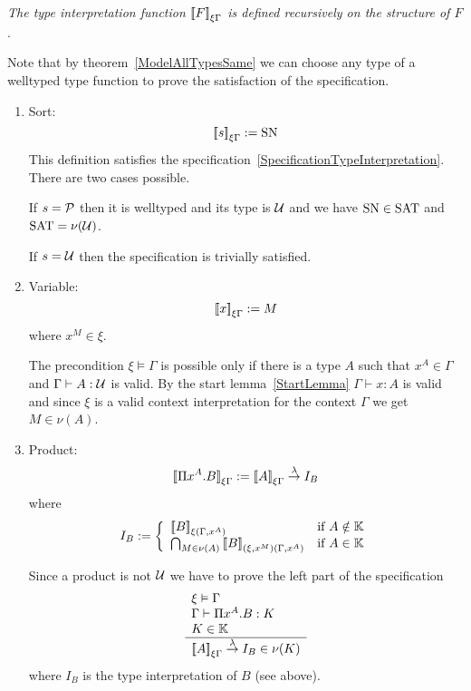 \begin{definition}
    \label{DefinitionTypeInterpretation}
    \emph{The type interpretation function ${{{[\![} F {]\!]}}_{\xi\Gamma}}$ is defined
    recursively on the structure of $F$}.

    Note that by theorem~\ref{ModelAllTypesSame} we can choose any type of a
    welltyped type function to prove the satisfaction of the specification.

    \begin{enumerate}
    \item Sort:
        $$
        {{{[\![} s {]\!]}}_{\xi\Gamma}} := \text{SN}
        $$
        This definition satisfies the
            specification~\ref{SpecificationTypeInterpretation}. There are two
            cases possible.

            If $s = {\cal P}$ then it is welltyped and its type is ${\cal U}$ and we
            have $\text{SN} \in \text{SAT}$ and $\text{SAT} = \nu({\cal U})$.

            If $s = {\cal U}$ then the specification is trivially satisfied.

    \item Variable:
        $$
        {{{[\![} x {]\!]}}_{\xi\Gamma}} := M
        $$
        where $x^{M} \in \xi$.

        The precondition $\xi \vDash \Gamma$ is possible only if there is a type
        $A$ such that $x^A \in \Gamma$ and $\Gamma \vdash A: {\cal U}$ is valid.
        By the start lemma~\ref{StartLemma} $\Gamma \vdash x : A$ is valid
        and since $\xi$ is a valid context interpretation for the context
        $\Gamma$ we get $M \in \nu(A)$.


    \item Product:
        $$
            {{{[\![} \Pi x^A.B {]\!]}}_{\xi\Gamma}}
            :=
            {{{[\![} A {]\!]}}_{\xi\Gamma}} \stackrel{\lambda}{\to} I_B
        $$
        where
            $$
            I_B :=
            \left\{
            \begin{array}{ll}
                {{{[\![}B {]\!]}}_{\xi(\Gamma,x^A)}}
                & \text{if } A \notin \mathbb{K}
                \\
                \bigcap_{M\in\nu(A)}
                {{{[\![} B {]\!]}}_{(\xi,x^M)(\Gamma,x^A)}}
                & \text{if }  A \in \mathbb{K}
            \end{array}
            \right.
        $$

        Since a product is not ${\cal U}$ we have to prove the left part of the
            specification
        $$
        \begin{array}{l} 
            \xi \vDash \Gamma
            \\
            \Gamma \vdash \Pi x^A.B : K
            \\
            K \in \mathbb{K}
         \\ \hline 
            {{{[\![}A {]\!]}}_{\xi\Gamma}} \stackrel{\lambda}{\to} I_B \in \nu(K)
        \end{array}
        $$
        where $I_B$ is the type interpretation of $B$ (see above).


\end{enumerate}
\end{definition}
